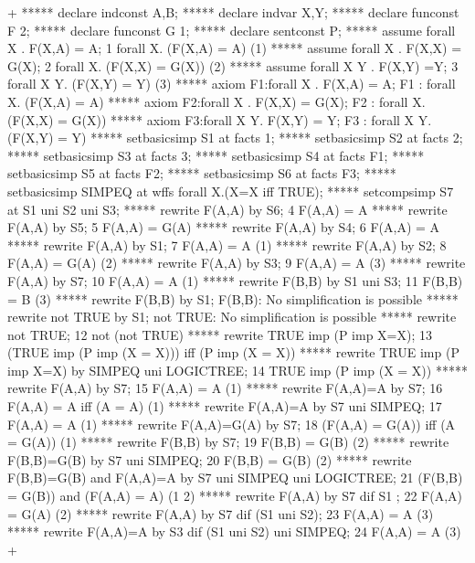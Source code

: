 \gfexample+
   ***** declare indconst A,B;
   ***** declare indvar X,Y;
   ***** declare funconst F 2;
   ***** declare funconst G 1;
   ***** declare sentconst P;
   ***** assume forall X . F(X,A) = A;
   1   forall X. (F(X,A) = A)     (1)
   ***** assume forall X . F(X,X) = G(X);
   2   forall X. (F(X,X) = G(X))     (2)
   ***** assume forall X Y . F(X,Y) =Y;
   3   forall X Y. (F(X,Y) = Y)     (3)
   ***** axiom F1:forall X . F(X,A) = A;
   F1 : forall X. (F(X,A) = A)
   ***** axiom F2:forall X . F(X,X) = G(X);
   F2 : forall X. (F(X,X) = G(X))
   ***** axiom F3:forall X Y. F(X,Y) = Y;
   F3 : forall X Y. (F(X,Y) = Y)
   ***** setbasicsimp S1 at facts {1};
   ***** setbasicsimp S2 at facts {2};
   ***** setbasicsimp S3 at facts {3};
   ***** setbasicsimp S4 at facts {F1};
   ***** setbasicsimp S5 at facts {F2};
   ***** setbasicsimp S6 at facts {F3};
   ***** setbasicsimp SIMPEQ at wffs {forall X.(X=X iff TRUE)};
   ***** setcompsimp S7 at S1 uni S2 uni S3;
   ***** rewrite F(A,A) by S6;
   4   F(A,A) = A     
   ***** rewrite F(A,A) by S5;
   5   F(A,A) = G(A)     
   ***** rewrite F(A,A) by S4;
   6   F(A,A) = A     
   ***** rewrite F(A,A) by S1;
   7   F(A,A) = A     (1)
   ***** rewrite F(A,A) by S2;
   8   F(A,A) = G(A)     (2)
   ***** rewrite F(A,A) by S3;
   9   F(A,A) = A     (3)
   ***** rewrite F(A,A) by S7;
   10   F(A,A) = A     (1)
   ***** rewrite F(B,B) by S1 uni S3;
   11   F(B,B) = B     (3)
   ***** rewrite F(B,B) by S1;
   F(B,B): No simplification is possible
   ***** rewrite not TRUE by S1;
   not TRUE: No simplification is possible
   ***** rewrite not TRUE;
   12   not (not TRUE)     
   ***** rewrite TRUE imp (P imp X=X);
   13   (TRUE imp (P imp (X = X))) iff (P imp (X = X)) 
   ***** rewrite TRUE imp (P imp X=X) by SIMPEQ uni LOGICTREE;
   14   TRUE imp (P imp (X = X))
   ***** rewrite F(A,A) by S7;
   15   F(A,A) = A     (1)
   ***** rewrite F(A,A)=A by S7;
   16   F(A,A) = A  iff (A = A)   (1)
   ***** rewrite F(A,A)=A by S7 uni SIMPEQ;
   17   F(A,A) = A     (1)
   ***** rewrite F(A,A)=G(A) by S7;
   18   (F(A,A) = G(A)) iff (A = G(A))     (1)
   ***** rewrite F(B,B) by S7;
   19   F(B,B) = G(B)     (2)
   ***** rewrite F(B,B)=G(B) by S7 uni SIMPEQ;
   20   F(B,B) = G(B)     (2)
   ***** rewrite F(B,B)=G(B) and F(A,A)=A by S7 uni SIMPEQ uni LOGICTREE;
   21   (F(B,B) = G(B)) and (F(A,A) = A)     (1 2)
   ***** rewrite F(A,A) by S7 dif S1 ;
   22   F(A,A) = G(A)     (2)
   ***** rewrite F(A,A) by S7 dif (S1 uni S2);
   23   F(A,A) = A     (3)
   ***** rewrite F(A,A)=A by S3 dif (S1 uni S2) uni SIMPEQ;
   24   F(A,A) = A     (3)
+
   